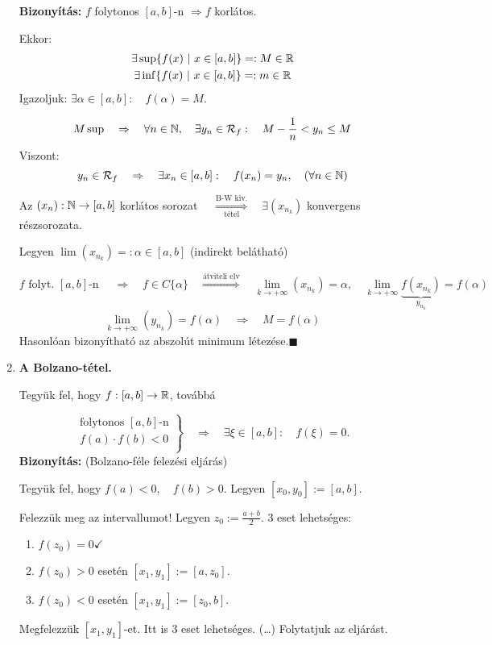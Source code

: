 \documentclass[a4paper,11.5pt]{article}
\begin{document}
\begin{enumerate}
		\textbf{Bizonyítás:} $f$ folytonos $[a,b]$-n $\Rightarrow f$ korlátos.
		
		Ekkor:\[
		\begin{gathered}
		\exists \sup\{f(x)\ |\ x\in [a,b]\} =: M \in \mathbb{R}\\
		\exists \inf\{f(x)\ |\ x\in [a,b]\} =: m \in \mathbb{R}\\
		\end{gathered}\]
		Igazoljuk: $\exists \alpha \in [a,b]:\quad  f(\alpha) = M$.
		
		\[\begin{gathered}
		M \sup\quad  \Rightarrow \quad \forall n \in \mathbb{N},\quad  \exists y_n\in\mathcal{R}_f:\quad  M - \frac{1}{n} < y_n \leq M 
		\end{gathered}\]
		Viszont: \[y_n\in\mathcal{R}_f \quad \Rightarrow\quad  \exists x_n\in [a,b]:\quad  f(x_n) = y_n,\quad (\forall n\in\mathbb{N})\]
		
		Az $(x_n): \mathbb{N}\to[a,b]$ korlátos sorozat $\quad \overset{\text{B-W kiv.}}{\underset{\text{tétel}}{\Longrightarrow}} \quad \exists (x_{n_k})$ konvergens részsorozata.
		
		Legyen $\lim(x_{n_k}) =: \alpha \in [a,b]$ (indirekt belátható)
		
		\[f\text{ folyt. }[a,b]\text{-n }\quad \Rightarrow \quad f\in C\{\alpha\} \quad \overset{\text{átviteli elv}}{\Rightarrow}\quad 
		\lim_{k\to+\infty}(x_{n_k})=\alpha,\quad \lim_{k\to+\infty}\underbrace{f (x_{n_k})}_{y_{n_k}} = f(\alpha)\]
		\[ \lim_{k\to+\infty}(y_{n_k}) = f(\alpha) \quad \Rightarrow\quad M = f(\alpha) \]
		Hasonlóan bizonyítható az abszolút minimum létezése.\quad $\blacksquare$
		\item \textbf{A Bolzano-tétel.}
		
		Tegyük fel, hogy $f:[a,b]\to\mathbb{R}$, továbbá
		
		\[\left.\begin{gathered}
		\text{folytonos } [a,b]\text{-n}\\
		f(a)\cdot f(b)<0\\
		\end{gathered}\right\}\quad \Rightarrow\quad \exists\xi\in[a,b]:\quad f(\xi)=0. \]
		\textbf{Bizonyítás:} (Bolzano-féle felezési eljárás)
		
		Tegyük fel, hogy $f(a)<0,\quad  f(b)>0.$ \quad Legyen $[x_0, y_0]:=[a,b]$.
		
		\medskip
		Felezzük meg az intervallumot! Legyen $z_0:=\frac{a+b}{2}$. 3 eset lehetséges:
		\begin{enumerate}
			\item $f(z_0)=0 \checkmark$
			\item $f(z_0)>0$ esetén $[x_1,y_1]:=[a,z_0]$.
			\item $f(z_0)<0$ esetén $[x_1,y_1]:=[z_0,b].$
		\end{enumerate}
		Megfelezzük $[x_1,y_1]$-et. Itt is 3 eset lehetséges. (\ldots) Folytatjuk az eljárást.
		

\end{enumerate}
\end{document}
